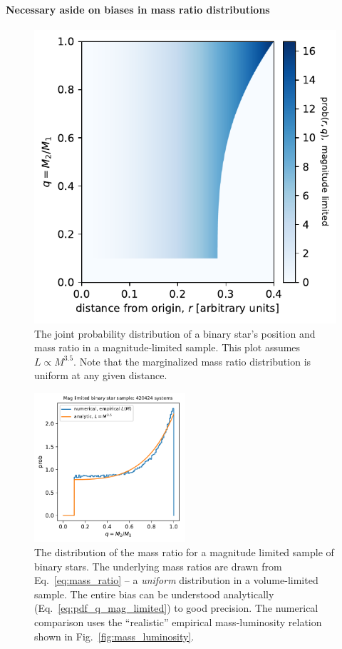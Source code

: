 \documentclass{emulateapj}
\begin{document}
\paragraph{Necessary aside on biases in mass ratio distributions}

\begin{figure}[!t]
    \begin{center}
        \includegraphics[width=.5\textwidth]{figures/joint_prob_r_q.pdf}
    \end{center}
    \caption{The joint probability distribution of a binary star's position 
        and 
        mass ratio in a magnitude-limited sample. This plot assumes $L\propto 
        M^{3.5}$. Note that the marginalized 
        mass ratio distribution is uniform at any given distance.}
    \label{fig:joint_prob_r_q}
\end{figure}

\begin{figure}[!t]
    \begin{center}
        \includegraphics[width=0.5\textwidth]{figures/q_distribn_mag_limited.pdf}
    \end{center}
    \caption{The distribution of the mass ratio for a magnitude limited 
        sample of binary stars. The underlying mass ratios are drawn from 
        Eq.~\ref{eq:mass_ratio} -- a \textit{uniform} distribution in a 
        volume-limited sample.
        The entire bias can be understood analytically 
        (Eq.~\ref{eq:pdf_q_mag_limited}) to good precision. 
        The numerical comparison uses the ``realistic'' empirical 
        mass-luminosity relation shown in Fig.~\ref{fig:mass_luminosity}.
    }
    \label{fig:q_distribn_mag_limited}
\end{figure}
\end{document}
